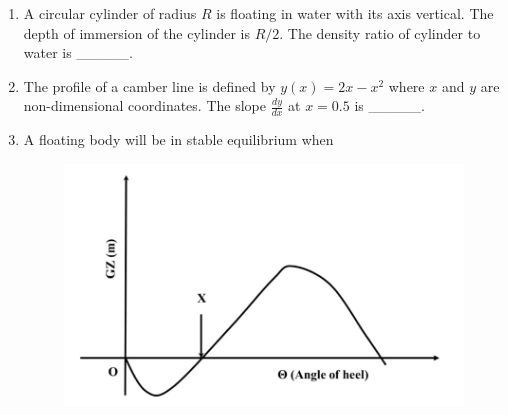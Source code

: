 \documentclass[journal,12pt,onecolumn]{IEEEtran}
\theoremstyle{remark}
\begin{document}
\begin{enumerate}
\item A circular cylinder of radius $R$ is floating in water with its axis vertical. The depth of immersion of the cylinder is $R/2$.  
The density ratio of cylinder to water is \_\_\_\_\_.\hfill{}

\begin{enumerate}[label=\Alph*.]
\end{enumerate}

\item The profile of a camber line is defined by $y(x) = 2x - x^2$ where $x$ and $y$ are non-dimensional coordinates.  
The slope $\frac{dy}{dx}$ at $x = 0.5$ is \_\_\_\_\_.\hfill{}

\begin{enumerate}[label=\Alph*.]
\end{enumerate}

\item A floating body will be in stable equilibrium when\hfill{}

\begin{figure}[H]
    \centering
    \includegraphics[scale=0.3]{figs/q14.jpg}
    \caption{}
    \label{fig:figure1}
\end{figure}


\end{enumerate}
\end{document}
